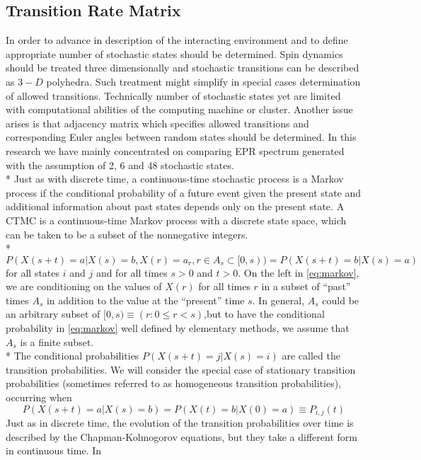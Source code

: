 \subsection{Transition Rate Matrix}
In order to advance in description of the interacting environment and to define appropriate number of stochastic states should be determined. Spin dynamics should be treated three dimensionally and stochastic transitions can be described as $3-D$ polyhedra. Such treatment might simplify in special cases determination of allowed transitions. Technically number of stochastic states yet are limited with computational abilities of the computing machine or cluster. Another issue arises is that adjacency matrix which specifies allowed transitions and corresponding Euler angles between random states should be determined. In this research we have mainly concentrated on comparing EPR spectrum generated with the assumption of 2, 6 and 48 stochastic states. \\*
Just as with discrete time, a continuous-time stochastic process is a Markov process if the conditional probability of a future event given the present state and additional information about past states depends only on the present state. A CTMC is a continuous-time Markov process with a discrete state space, which can be taken to be a subset of the nonnegative integers.\\*
\begin{equation}\label{eq:markov}
P(X(s+t)=a|X(s)=b,X(r)=a_r,r\in A_s\subset[0,s))=P(X(s+t)=b|X(s)=a)
\end{equation} 
for all states $i$ and $j$ and for all times $s > 0$ and $t > 0$. On the left in \ref{eq:markov}, we are conditioning on the values of $X(r)$ for all times $r$ in a subset of “past” times $A_s$ in addition to the value at the “present” time $s$. In general, $A_s$ could be an arbitrary subset of $[0, s) \equiv (r:0\leq r<s)$,but to have the conditional probability in \ref{eq:markov} well defined by elementary methods, we assume that $A_s$ is a finite subset. \\*
The conditional probabilities $P(X(s+t) = j|X(s) = i)$ are called the transition probabilities. We will consider the special case of stationary transition probabilities (sometimes referred to as homogeneous transition probabilities), occurring when
\begin{equation}\label{eq:markov}
P(X(s+t)=a|X(s)=b)=P(X(t)=b|X(0)=a) \equiv P_{i,j}(t)
\end{equation} 
Just as in discrete time, the evolution of the transition probabilities over time is described by the Chapman-Kolmogorov equations, but they take a different form in continuous time. In
